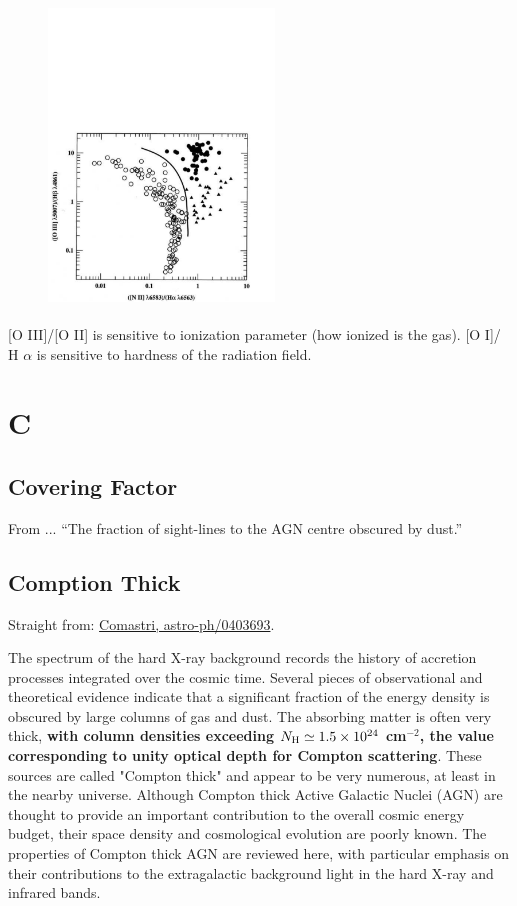 \documentclass[11pt]{article}
\begin{document}
    \begin{figure}
      \includegraphics[height=8.0cm,width=6.0cm]
      {BPT.pdf}
      \caption[]{}
    \end{figure}
    [O III]/[O II] is sensitive to ionization parameter (how ionized is the gas).
    [O I]/ H $\alpha$ is sensitive to hardness of the radiation field. 
    
    
\section{C}

    \subsection{Covering Factor}
    From \citet[e.g.,][]{Roseboom13}...
``The fraction of sight-lines to the AGN centre obscured by dust.''

    \subsection{Comption Thick}
    Straight from: \href{http://ned.ipac.caltech.edu/level5/March04/Comastri/frames.html}{Comastri,  astro-ph/0403693}.
    
    The spectrum of the hard X-ray background records the history of
    accretion processes integrated over the cosmic time. Several pieces of
    observational and theoretical evidence indicate that a significant
    fraction of the energy density is obscured by large columns of gas and
    dust. The absorbing matter is often very thick, {\bf with column densities
      exceeding $N_{\rm H} \simeq 1.5 \times10^{24}$ cm$^{-2}$, the value corresponding to unity
      optical depth for Compton scattering}. These sources are called
    "Compton thick" and appear to be very numerous, at least in the nearby
    universe. Although Compton thick Active Galactic Nuclei (AGN) are
    thought to provide an important contribution to the overall cosmic
    energy budget, their space density and cosmological evolution are
    poorly known. The properties of Compton thick AGN are reviewed here,
    with particular emphasis on their contributions to the extragalactic
    background light in the hard X-ray and infrared bands.
    
\end{document}

